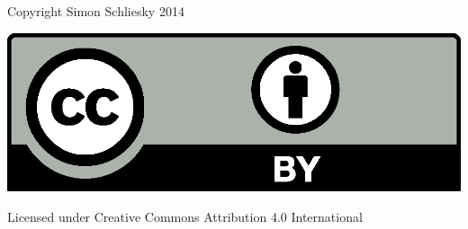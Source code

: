 Copyright Simon Schliesky 2014

\includegraphics{by}

Licensed under Creative Commons Attribution 4.0 International

